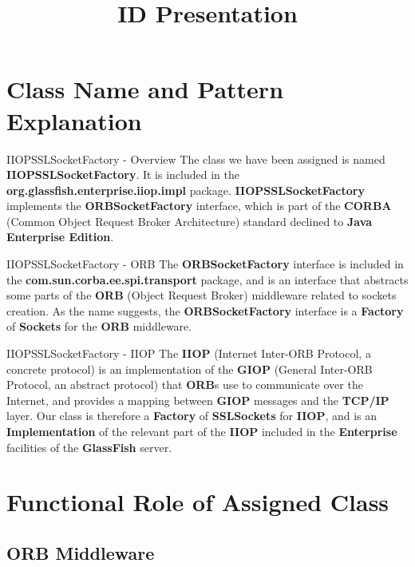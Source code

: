 \documentclass{../common/latex_classes/pdf_presentation}
\title{ID Presentation}
\begin{document}
	\titleToc{}
		\section{Class Name and Pattern Explanation}
		
		\begin{frame}{IIOPSSLSocketFactory - Overview}
			The class we have been assigned is named \textbf{IIOPSSLSocketFactory}.
			It is included in the \textbf{org.glassfish.enterprise.iiop.impl} package.
			\textbf{IIOPSSLSocketFactory} implements the \textbf{ORBSocketFactory} interface, which is part of the \textbf{CORBA} (Common Object Request Broker Architecture) standard declined to \textbf{Java Enterprise Edition}.
		\end{frame}
		
		\begin{frame}{IIOPSSLSocketFactory - ORB}
			The \textbf{ORBSocketFactory} interface is included in the \textbf{com.sun.corba.ee.spi.transport} package, and is an interface that abstracts some parts of the \textbf{ORB} (Object Request Broker) middleware related to sockets creation.
			As the name suggests, the \textbf{ORBSocketFactory} interface is a \textbf{Factory} of \textbf{Sockets} for the \textbf{ORB} middleware.
		\end{frame}
		
		\begin{frame}{IIOPSSLSocketFactory - IIOP}
			The \textbf{IIOP} (Internet Inter-ORB Protocol, a concrete protocol) is an implementation of the \textbf{GIOP} (General Inter-ORB Protocol, an abstract protocol) that \textbf{ORB}s use to communicate over the Internet, and provides a mapping between \textbf{GIOP} messages and the \textbf{TCP/IP} layer.
			Our class is therefore a \textbf{Factory} of \textbf{SSLSockets} for \textbf{IIOP}, and is an \textbf{Implementation} of the relevant part of the \textbf{IIOP} included in the \textbf{Enterprise} facilities of the \textbf{GlassFish} server.
		\end{frame}
		
		\section{Functional Role of Assigned Class}
		
		\subsection{ORB Middleware}
		
\end{document}
